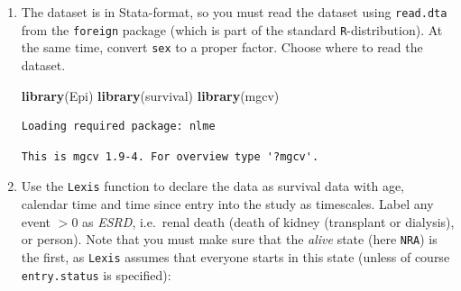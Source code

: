\documentclass[
]{book}
\newenvironment{Shaded}{\begin{snugshade}}{\end{snugshade}}
\newcommand{\AttributeTok}[1]{\textcolor[rgb]{0.13,0.29,0.53}{#1}}
\newcommand{\CommentTok}[1]{\textcolor[rgb]{0.56,0.35,0.01}{\textit{#1}}}
\newcommand{\FunctionTok}[1]{\textcolor[rgb]{0.13,0.29,0.53}{\textbf{#1}}}
\newcommand{\NormalTok}[1]{#1}
\newcommand{\OtherTok}[1]{\textcolor[rgb]{0.56,0.35,0.01}{#1}}
\newcommand{\SpecialCharTok}[1]{\textcolor[rgb]{0.81,0.36,0.00}{\textbf{#1}}}
\newcommand{\StringTok}[1]{\textcolor[rgb]{0.31,0.60,0.02}{#1}}
\begin{document}
\begin{enumerate}
\def\labelenumi{\arabic{enumi}.}
\item
  The dataset is in Stata-format, so you must read the dataset
  using \texttt{read.dta} from the \texttt{foreign} package (which is
  part of the standard \texttt{R}-distribution). At the same time, convert
  \texttt{sex} to a proper factor. Choose where to read the dataset.

\begin{Shaded}
\begin{Highlighting}[]
\FunctionTok{library}\NormalTok{(Epi)}
\FunctionTok{library}\NormalTok{(survival)}
\FunctionTok{library}\NormalTok{(mgcv)}
\end{Highlighting}
\end{Shaded}

\begin{verbatim}
Loading required package: nlme
\end{verbatim}

\begin{verbatim}
This is mgcv 1.9-4. For overview type '?mgcv'.
\end{verbatim}

\begin{Shaded}
\end{Shaded}
\item
  Use the \texttt{Lexis} function to declare the data as
  survival data with age, calendar time and time since entry into
  the study as timescales. Label any event \(>0\) as \emph{ESRD},
  i.e.~renal death (death of kidney (transplant or dialysis), or
  person).
  Note that you must make sure that the \emph{alive} state (here
  \texttt{NRA}) is the first, as \texttt{Lexis} assumes that
  everyone starts in this state (unless of course
  \texttt{entry.status} is specified):


\end{enumerate}
\end{document}
